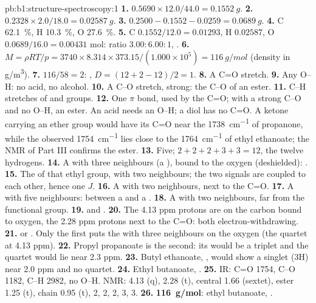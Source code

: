 \begin{solution}{pb:b1:structure-spectroscopy:1}
\textbf{1.} $0.5690 \times 12.0/44.0 = \qty{0.1552}{g}$.
\textbf{2.} $0.2328 \times 2.0/18.0 = \qty{0.02587}{g}$.
\textbf{3.} $0.2500 - 0.1552 - 0.0259 = \qty{0.0689}{g}$.
\textbf{4.} C \qty{62.1}{\percent}, H \qty{10.3}{\percent}, O
\qty{27.6}{\percent}.
\textbf{5.} C $0.1552/12.0 = 0.01293$, H $0.02587$, O $0.0689/16.0 =
0.00431$ mol: ratio $3.00 : 6.00 : 1$, .
\textbf{6.} $M = \rho RT/p = 3740 \times 8.314 \times 373.15/(1.000 \times 10^5) =
\qty{116}{g/mol}$ (density in \unit{g/m^3}).
\textbf{7.} $116/58 = 2$: , $D = (12 + 2 - 12)/2 = 1$.
\textbf{8.} A C=O stretch.
\textbf{9.} Any O--H: no acid, no alcohol.
\textbf{10.} A C--O stretch, strong: the C--O of an ester.
\textbf{11.} C--H stretches of  and  groups.
\textbf{12.} One $\pi$ bond, used by the C=O; with a strong C--O and no
O--H, an ester. An acid needs an O--H; a diol has no C=O. A ketone
carrying an ether group would have its C=O near the \qty{1738}{cm^{-1}}
of propanone, while the observed \qty{1754}{cm^{-1}} lies close to the
\qty{1764}{cm^{-1}} of ethyl ethanoate; the NMR of Part III confirms the
ester.
\textbf{13.} Five; $2 + 2 + 2 + 3 + 3 = 12$, the twelve hydrogens.
\textbf{14.} A  with three neighbours (a ), bound to the
oxygen (deshielded): .
\textbf{15.} The  of that ethyl group, with two neighbours; the two
signals are coupled to each other, hence one $J$.
\textbf{16.} A  with two neighbours, next to the C=O.
\textbf{17.} A  with five neighbours: between a  and a
.
\textbf{18.} A  with two neighbours, far from the functional group.
\textbf{19.}  and .
\textbf{20.} The 4.13 ppm protons are on the carbon bound to oxygen, the
2.28 ppm protons next to the C=O: both electron-withdrawing.
\textbf{21.}  or . Only
the first puts the  with three neighbours on the oxygen (the
quartet at 4.13 ppm).
\textbf{22.} Propyl propanoate is the second: its  would be a
triplet and the quartet would lie near 2.3 ppm.
\textbf{23.} Butyl ethanoate, , would show a singlet (3H)
near 2.0 ppm and no quartet.
\textbf{24.} Ethyl butanoate, .
\textbf{25.} IR: C=O 1754, C--O 1182, C--H 2982, no O--H. NMR: 
4.13 (q),  2.28 (t), central  1.66 (sextet), ester
 1.25 (t), chain  0.95 (t),  2, 2, 2, 3, 3.
\textbf{26.} \textbf{\qty{116}{g/mol}}: ethyl butanoate, .
\end{solution}
